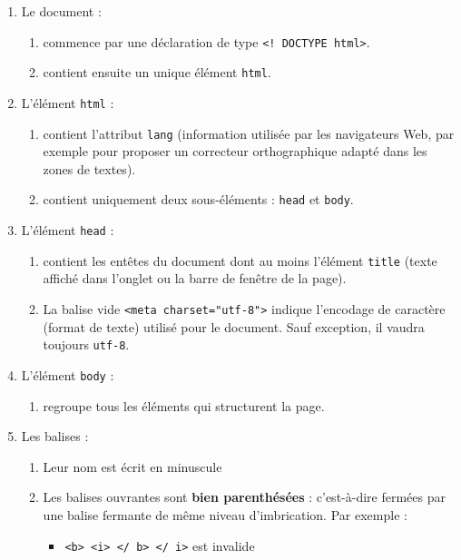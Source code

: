 \documentclass[a4paper,17pt]{extarticle}
\providecommand{\tightlist}{%
      \setlength{\itemsep}{0pt}\setlength{\parskip}{0pt}}
\begin{document}
\begin{enumerate}
\def\labelenumi{\arabic{enumi}.}
\tightlist
\item
  Le document :

  \begin{enumerate}
  \def\labelenumii{\arabic{enumii}.}
  \tightlist
  \item
    commence par une déclaration de type
    \texttt{\textless{}!\ DOCTYPE\ html\textgreater{}}.
  \item
    contient ensuite un unique élément \texttt{html}.
  \end{enumerate}
\item
  L'élément \texttt{html} :

  \begin{enumerate}
  \def\labelenumii{\arabic{enumii}.}
  \tightlist
  \item
    contient l'attribut \texttt{lang} (information utilisée par les
    navigateurs Web, par exemple pour proposer un correcteur
    orthographique adapté dans les zones de textes).
  \item
    contient uniquement deux sous-éléments : \texttt{head} et
    \texttt{body}.
  \end{enumerate}
\item
  L'élément \texttt{head} :

  \begin{enumerate}
  \def\labelenumii{\arabic{enumii}.}
  \tightlist
  \item
    contient les entêtes du document dont au moins l'élément
    \texttt{title} (texte affiché dans l'onglet ou la barre de fenêtre
    de la page).
  \item
    La balise vide
    \texttt{\textless{}meta\ charset="utf-8"\textgreater{}} indique
    l'encodage de caractère (format de texte) utilisé pour le document.
    Sauf exception, il vaudra toujours \texttt{utf-8}.
  \end{enumerate}
\item
  L'élément \texttt{body} :

  \begin{enumerate}
  \def\labelenumii{\arabic{enumii}.}
  \tightlist
  \item
    regroupe tous les éléments qui structurent la page.
  \end{enumerate}
\item
  Les balises :

  \begin{enumerate}
  \def\labelenumii{\arabic{enumii}.}
  \tightlist
  \item
    Leur nom est écrit en minuscule
  \item
    Les balises ouvrantes sont \textbf{bien parenthésées} : c'est-à-dire
    fermées par une balise fermante de même niveau d'imbrication. Par
    exemple :

    \begin{itemize}
    \tightlist
    \item
      \texttt{\textless{}b\textgreater{}\ \textless{}i\textgreater{}\ \textless{}/\ b\textgreater{}\ \textless{}/\ i\textgreater{}}
      est invalide
    \end{itemize}
  \end{enumerate}
\end{enumerate}
\end{document}
